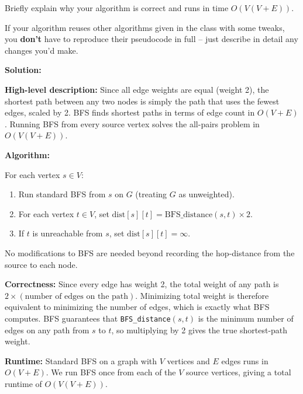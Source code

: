 \documentclass[addpoints]{exam}
\begin{document}
\begin{questions}
Briefly explain why your algorithm is correct and runs in time $O(V(V+E))$.

If your algorithm reuses other algorithms given in the class with some tweaks, you \textbf{don't} have to reproduce their pseudocode in full -- just describe in detail any changes you'd make.

\textbf{Solution:}

\textbf{High-level description:} Since all edge weights are equal (weight 2), the shortest path between any two nodes is simply the path that uses the fewest edges, scaled by 2. BFS finds shortest paths in terms of edge count in $O(V+E)$. Running BFS from every source vertex solves the all-pairs problem in $O(V(V+E))$.

\textbf{Algorithm:}

For each vertex $s \in V$:
\begin{enumerate}
  \item Run standard BFS from $s$ on $G$ (treating $G$ as unweighted).
  \item For each vertex $t \in V$, set $\text{dist}[s][t] = \text{BFS\_distance}(s, t) \times 2$.
  \item If $t$ is unreachable from $s$, set $\text{dist}[s][t] = \infty$.
\end{enumerate}

No modifications to BFS are needed beyond recording the hop-distance from the source to each node.

\textbf{Correctness:} Since every edge has weight 2, the total weight of any path is $2 \times (\text{number of edges on the path})$. Minimizing total weight is therefore equivalent to minimizing the number of edges, which is exactly what BFS computes. BFS guarantees that \texttt{BFS\_distance}$(s, t)$ is the minimum number of edges on any path from $s$ to $t$, so multiplying by 2 gives the true shortest-path weight.

\textbf{Runtime:} Standard BFS on a graph with $V$ vertices and $E$ edges runs in $O(V + E)$. We run BFS once from each of the $V$ source vertices, giving a total runtime of $O(V(V+E))$.


\end{questions}
\end{document}
